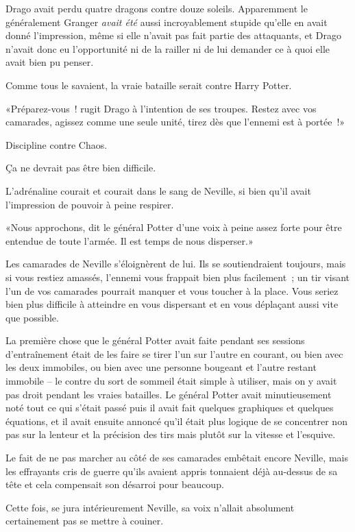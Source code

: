 Drago avait perdu quatre dragons contre douze soleils. Apparemment le généralement Granger \emph{avait été} aussi incroyablement stupide qu'elle en avait donné l'impression, même si elle n'avait pas fait partie des attaquants, et Drago n'avait donc eu l'opportunité ni de la railler ni de lui demander ce à quoi elle avait bien pu penser.

Comme tous le savaient, la vraie bataille serait contre Harry Potter.

«Préparez-vous~! rugit Drago à l'intention de ses troupes. Restez avec vos camarades, agissez comme une seule unité, tirez dès que l'ennemi est à portée~!»

Discipline contre Chaos.

Ça ne devrait pas être bien difficile.

\later

L'adrénaline courait et courait dans le sang de Neville, si bien qu'il avait l'impression de pouvoir à peine respirer.

«Nous approchons, dit le général Potter d'une voix à peine assez forte pour être entendue de toute l'armée. Il est temps de nous disperser.»

Les camarades de Neville s'éloignèrent de lui. Ils se soutiendraient toujours, mais si vous restiez amassés, l'ennemi vous frappait bien plus facilement~; un tir visant l'un de vos camarades pourrait manquer et vous toucher à la place. Vous seriez bien plus difficile à atteindre en vous dispersant et en vous déplaçant aussi vite que possible.

La première chose que le général Potter avait faite pendant ses sessions d'entraînement était de les faire se tirer l'un sur l'autre en courant, ou bien avec les deux immobiles, ou bien avec une personne bougeant et l'autre restant immobile -- le contre du sort de sommeil était simple à utiliser, mais on y avait pas droit pendant les vraies batailles. Le général Potter avait minutieusement noté tout ce qui s'était passé puis il avait fait quelques graphiques et quelques équations, et il avait ensuite annoncé qu'il était plus logique de se concentrer non pas sur la lenteur et la précision des tirs mais plutôt sur la vitesse et l'esquive.

Le fait de ne pas marcher au côté de ses camarades embêtait encore Neville, mais les effrayants cris de guerre qu'ils avaient appris tonnaient déjà au-dessus de sa tête et cela compensait son désarroi pour beaucoup.

Cette fois, se jura intérieurement Neville, sa voix n'allait absolument certainement pas se mettre à couiner.

